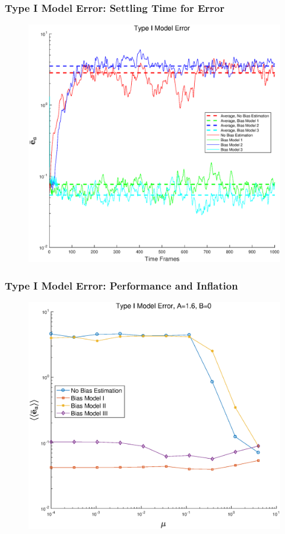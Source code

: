 \documentclass{beamer}
\begin{document}
\begin{frame}
\frametitle{Type I Model Error: Settling Time for Error}
\begin{figure} 
\centering
\includegraphics[scale=0.4]{Figures/ErrVsTimeM1_1}
\end{figure}
\end{frame}

\begin{frame}
\frametitle{Type I Model Error: Performance and Inflation}
\begin{figure} 
\centering
\includegraphics[scale=0.4]{Figures/AErrVsMuM1_1}
\end{figure}
\end{frame}
\end{document}
